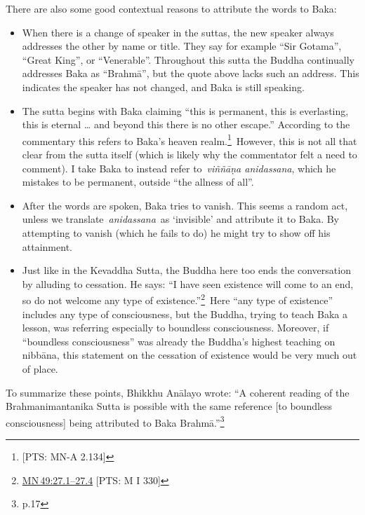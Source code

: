 \documentclass[10pt, openright]{book}
\begin{document}
There are also some good contextual reasons to attribute the words to Baka:


\begin{itemize}

\itemsep5pt\parskip0pt


\item
When there is a change of speaker in the suttas, the new speaker always addresses the other by name or title. They say for example “Sir Gotama”, “Great King”, or “Venerable”. Throughout this sutta the Buddha continually addresses Baka as “Brahmā”, but the quote above lacks such an address. This indicates the speaker has not changed, and Baka is still speaking.



\item
The sutta begins with Baka claiming “this is permanent, this is everlasting, this is eternal … and beyond this there is no other escape.” According to the commentary this refers to Baka’s heaven realm.\footnote {[PTS: MN-A 2.134]} However, this is not all that clear from the sutta itself (which is likely why the commentator felt a need to comment). I take Baka to instead refer to \textit{viññāṇa anidassana}, which he mistakes to be permanent, outside “the allness of all”.



\item
After the words are spoken, Baka tries to vanish. This seems a random act, unless we translate \textit{anidassana} as ‘invisible’ and attribute it to Baka. By attempting to vanish (which he fails to do) he might try to show off his attainment.



\item
Just like in the Kevaddha Sutta, the Buddha here too ends the conversation by alluding to cessation. He says: “I have seen existence will come to an end, so do not welcome any type of existence.”\footnote {\href{https://suttacentral.net/mn49/en/sujato\#27.1}{MN 49:27.1–27.4} [PTS: M I 330]} Here “any type of existence” includes any type of consciousness, but the Buddha, trying to teach Baka a lesson, was referring especially to boundless consciousness. Moreover, if “boundless consciousness” was already the Buddha’s highest teaching on nibbāna, this statement on the cessation of existence would be very much out of place.





\end{itemize}
To summarize these points, Bhikkhu Anālayo wrote: “A coherent reading of the Brahmanimantanika Sutta is possible with the same reference [to boundless consciousness] being attributed to Baka Brahmā.”\footnote {\cite{Anālayo 2017} p.17}
\end{document}
